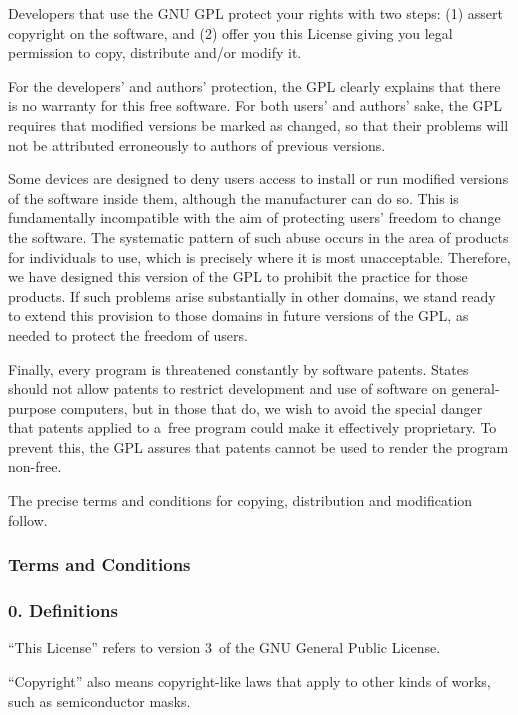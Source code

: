 \documentclass[a4paper, 11pt, twoside]{article}
\begin{document}
Developers that use the GNU GPL protect your rights with two steps: (1) assert copyright on the software, and (2) offer you this License giving you legal permission to copy, distribute and/or modify it.

For the developers' and authors' protection, the GPL clearly explains that there is no warranty for this free software. For both users' and authors' sake, the GPL requires that modified versions be marked as changed, so that their problems will not be attributed erroneously to authors of previous versions.

Some devices are designed to deny users access to install or run modified versions of the software inside them, although the manufacturer can do so. This is fundamentally incompatible with the aim of protecting users' freedom to change the software. The systematic pattern of such abuse occurs in the area of products for individuals to use, which is precisely where it is most unacceptable. Therefore, we have designed this version of the GPL to prohibit the practice for those products. If such problems arise substantially in other domains, we stand ready to extend this provision to those domains in future versions of the GPL, as needed to protect the freedom of users.

Finally, every program is threatened constantly by software patents. States should not allow patents to restrict development and use of software on general-purpose computers, but in those that do, we wish to avoid the special danger that patents applied to a~free program could make it effectively proprietary. To prevent this, the GPL assures that patents cannot be used to render the program non-free.

The precise terms and conditions for copying, distribution and modification follow.

\subsubsection{Terms and Conditions}

\subsubsection{0. Definitions}

“This License” refers to version 3~of the GNU General Public License.

“Copyright” also means copyright-like laws that apply to other kinds of works, such as semiconductor masks.
\end{document}
